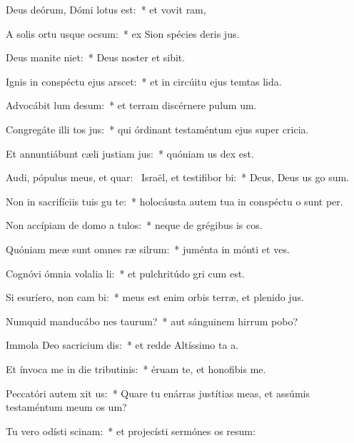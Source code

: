 \item Deus deórum, Dómi lotus est:~* et vovit ram,
\item A solis ortu usque  ocsum:~* ex Sion spécies deris jus.
\item Deus manite niet:~* Deus noster et  sibit.
\item Ignis in conspéctu ejus arscet:~* et in circúitu ejus temtas lida.
\item Advocábit lum desum:~* et terram discérnere pulum um.
\item Congregáte illi tos jus:~* qui órdinant testaméntum ejus super cricia.
\item Et annuntiábunt cæli justiam jus:~* quóniam us dex est.
\item Audi, pópulus meus, et quar:~\pscross{} Israël, et testifibor bi:~* Deus, Deus us go sum.
\item Non in sacrifíciis tuis gu te:~* holocáusta autem tua in conspéctu o sunt per.
\item Non accípiam de domo a tulos:~* neque de grégibus is cos.
\item Quóniam meæ sunt omnes ræ silrum:~* juménta in mónti et ves.
\item Cognóvi ómnia volalia li:~* et pulchritúdo gri cum est.
\item Si esuríero, non cam bi:~* meus est enim orbis terræ, et plenido jus.
\item Numquid manducábo nes taurum?~* aut sánguinem hirrum pobo?
\item Immola Deo sacricium dis:~* et redde Altíssimo ta a.
\item Et ínvoca me in die tributinis:~* éruam te, et honofibis me.
\item Peccatóri autem xit us:~* Quare tu enárras justítias meas, et assúmis testaméntum meum  os um?
\item Tu vero odísti scinam:~* et projecísti sermónes os resum:
